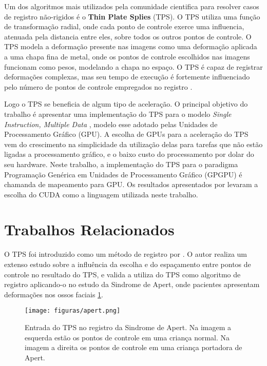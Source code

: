   Um dos algoritmos mais utilizados pela comunidade cientifica para resolver
casos de registro não-rigidos é o \textbf{Thin Plate Splies} (TPS). O TPS
utiliza uma função de transformação radial, onde cada ponto de controle exerce
uma influencia, atenuada pela distancia entre eles, sobre todos os outros
pontos de controle. O TPS modela a deformação presente nas imagens como uma
deformação aplicada a uma chapa fina de metal, onde os pontos de controle
escolhidos nas imagens funcionam como pesos, modelando a chapa no espaço.
O TPS é capaz de registrar deformações complexas, mas seu tempo de execução
é fortemente influenciado pelo número de pontos de controle empregados no
registro \cite{zitova2003image}.

  Logo o TPS se beneficia de algum tipo de aceleração. O principal objetivo do
trabalho é apresentar uma implementação do TPS para o modelo \textit{Single
Instruction, Multiple Data} \cite{patterson2013computer}, modelo esse adotado
pelas Unidades de Processamento Gráfico (GPU). A escolha de GPUs para a
aceleração do TPS vem do crescimento na simplicidade da utilização delas para
tarefas que não estão ligadas a processamento gráfico, e o baixo custo do
processamento por dolar do seu hardware. Neste trabalho, a implementação do TPS
para o paradigma Programação Genérica em Unidades de Processamento Gráfico
(GPGPU) é chamanda de mapeamento para GPU. Os resultados apresentados por
\cite{membarth2011frameworks} levaram a escolha do CUDA como a linguagem
utilizada neste trabalho.
\section{Trabalhos Relacionados}
\label{sec:trabalhosRelacionados}

  O TPS foi introduzido como um método de registro por
\cite{bookstein1989principal}. O autor realiza um extenso estudo sobre a
influência da escolha e do espaçamento entre pontos de controle no resultado do
TPS, e valida a utiliza do TPS como algoritmo de registro aplicando-o no estudo
da Sindrome de Apert, onde pacientes apresentam deformações nos ossos faciais
\ref{fig:apert}.

\begin{figure}[H]
    \centering
    \texttt{[image: figuras/apert.png]}
    \caption{Entrada do TPS no registro da Sindrome de Apert. Na imagem a
             esquerda estão os pontos de controle em uma criança normal. Na
             imagem a direita os pontos de controle em uma criança portadora de
             Apert.}
    \label{fig:apert}
\end{figure}

